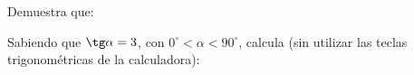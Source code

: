 \documentclass[addpoints,spanish, 12pt,a4paper]{exam}
\begin{document}
\begin{questions}
        \question Demuestra que:
        
        
        
        \question Sabiendo que $\tg \alpha = 3$, con $0^\circ < \alpha < 90^\circ$, calcula (sin utilizar las teclas trigonométricas de la calculadora):
        

\end{questions}
\end{document}
